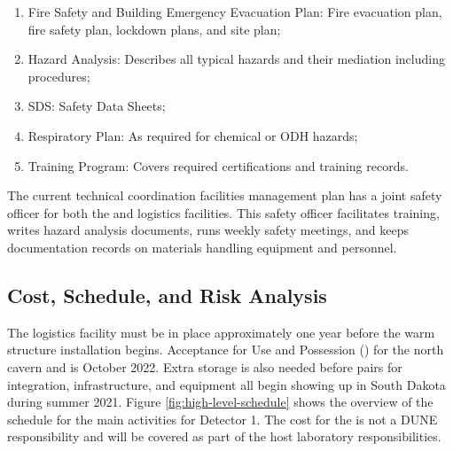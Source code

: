 \begin{enumerate}
\item	Fire Safety and Building Emergency Evacuation Plan: Fire evacuation plan, fire safety plan,  lockdown plans, and site plan;
\item	Hazard Analysis: Describes all typical hazards and their mediation including procedures; 
\item	SDS: Safety Data Sheets;
\item	Respiratory Plan: As required for chemical or ODH hazards;
\item	Training Program: Covers required certifications and  training records.
\end{enumerate}

The current technical coordination facilities management plan has a joint safety officer for both the  and logistics facilities. This safety officer facilitates training, writes hazard analysis documents, runs weekly safety meetings, and keeps documentation records on materials handling equipment and personnel. 




\subsection{Cost, Schedule, and Risk Analysis}
\label{sec:fdsp-tc-log-cost}


The logistics facility must be in place approximately one year before the warm structure installation begins.  
Acceptance for Use and Possession () for the north cavern and  is October 2022.  
Extra storage is also needed before  pairs for integration,  infrastructure, and equipment all begin showing up in  South Dakota during summer 2021. 
Figure \ref{fig:high-level-schedule} shows the overview of the schedule for the main activities for Detector 1. 
The cost for the  is not a DUNE responsibility and will be covered as part of the host laboratory responsibilities.


